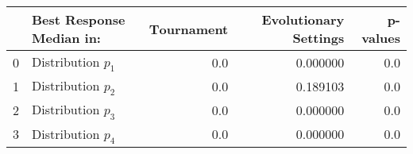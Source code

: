 \begin{tabular}{llrrr}
\toprule
{} & Best Response Median in: &  Τournament &  Evolutionary Settings &  p-values \\
\midrule
0 &       Distribution $p_1$ &         0.0 &               0.000000 &       0.0 \\
1 &       Distribution $p_2$ &         0.0 &               0.189103 &       0.0 \\
2 &       Distribution $p_3$ &         0.0 &               0.000000 &       0.0 \\
3 &       Distribution $p_4$ &         0.0 &               0.000000 &       0.0 \\
\bottomrule
\end{tabular}
